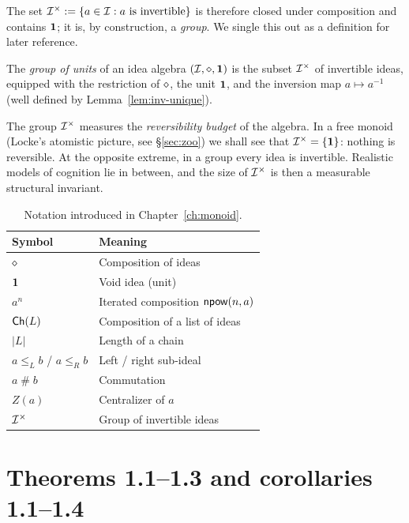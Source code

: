 The set $\mathcal{I}^{\times} \mathrel{:=} \{ a \in \mathcal{I} : a \text{ is invertible}\}$
is therefore closed under composition and contains $\mathbf{1}$; it is, by
construction, a \emph{group}.  We single this out as a definition for
later reference.

\begin{definition}\label{def:units}
The \emph{group of units} of an idea algebra $(\mathcal{I},\mathbin{\diamond},\mathbf{1})$ is the subset
$\mathcal{I}^{\times}$ of invertible ideas, equipped with the restriction of
$\mathbin{\diamond}$, the unit $\mathbf{1}$, and the inversion map $a \mapsto a^{-1}$
(well defined by Lemma~\ref{lem:inv-unique}).
\end{definition}

\begin{remark}
The group $\mathcal{I}^{\times}$ measures the \emph{reversibility budget} of
the algebra.  In a free monoid (Locke's atomistic picture, see
\S\ref{sec:zoo}) we shall see that $\mathcal{I}^{\times} = \{\mathbf{1}\}$: nothing
is reversible.  At the opposite extreme, in a group every idea is
invertible.  Realistic models of cognition lie in between, and the size of
$\mathcal{I}^{\times}$ is then a measurable structural invariant.
\end{remark}

\begin{table}[h]
\centering
\begin{tabular}{ll}
\hline
Symbol & Meaning \\
\hline
$\mathbin{\diamond}$ & Composition of ideas \\
$\mathbf{1}$ & Void idea (unit) \\
$a^n$ & Iterated composition $\mathsf{npow}(n, a)$ \\
$\mathsf{Ch}(L)$ & Composition of a list of ideas \\
$|L|$ & Length of a chain \\
$a \le_L b$ / $a \le_R b$ & Left / right sub-ideal \\
$a \mathrel{\#} b$ & Commutation \\
$Z(a)$ & Centralizer of $a$ \\
$\mathcal{I}^{\times}$ & Group of invertible ideas \\
\hline
\end{tabular}
\caption{Notation introduced in Chapter~\ref{ch:monoid}.}
\label{tab:notation-ch1}
\end{table}

\section{Theorems 1.1--1.3 and corollaries 1.1--1.4}\label{sec:headline}

